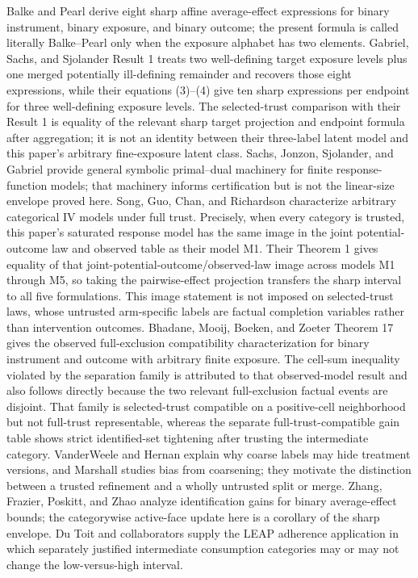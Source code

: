 \documentclass{article}
\begin{document}
Balke and Pearl derive eight sharp affine average-effect expressions for binary instrument, binary exposure, and binary outcome; the present formula is called literally Balke--Pearl only when the exposure alphabet has two elements. Gabriel, Sachs, and Sjolander Result 1 treats two well-defining target exposure levels plus one merged potentially ill-defining remainder and recovers those eight expressions, while their equations (3)--(4) give ten sharp expressions per endpoint for three well-defining exposure levels. The selected-trust comparison with their Result 1 is equality of the relevant sharp target projection and endpoint formula after aggregation; it is not an identity between their three-label latent model and this paper's arbitrary fine-exposure latent class. Sachs, Jonzon, Sjolander, and Gabriel provide general symbolic primal--dual machinery for finite response-function models; that machinery informs certification but is not the linear-size envelope proved here. Song, Guo, Chan, and Richardson characterize arbitrary categorical IV models under full trust. Precisely, when every category is trusted, this paper's saturated response model has the same image in the joint potential-outcome law and observed table as their model M1. Their Theorem 1 gives equality of that joint-potential-outcome/observed-law image across models M1 through M5, so taking the pairwise-effect projection transfers the sharp interval to all five formulations. This image statement is not imposed on selected-trust laws, whose untrusted arm-specific labels are factual completion variables rather than intervention outcomes. Bhadane, Mooij, Boeken, and Zoeter Theorem 17 gives the observed full-exclusion compatibility characterization for binary instrument and outcome with arbitrary finite exposure. The cell-sum inequality violated by the separation family is attributed to that observed-model result and also follows directly because the two relevant full-exclusion factual events are disjoint. That family is selected-trust compatible on a positive-cell neighborhood but not full-trust representable, whereas the separate full-trust-compatible gain table shows strict identified-set tightening after trusting the intermediate category. VanderWeele and Hernan explain why coarse labels may hide treatment versions, and Marshall studies bias from coarsening; they motivate the distinction between a trusted refinement and a wholly untrusted split or merge. Zhang, Frazier, Poskitt, and Zhao analyze identification gains for binary average-effect bounds; the categorywise active-face update here is a corollary of the sharp envelope. Du Toit and collaborators supply the LEAP adherence application in which separately justified intermediate consumption categories may or may not change the low-versus-high interval.
\end{document}
